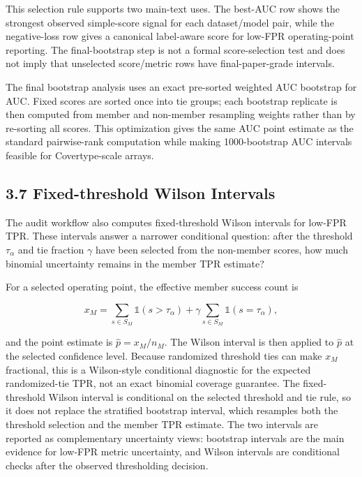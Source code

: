 \documentclass[
  10pt,
  twocolumn]{article}
\begin{document}
This selection rule supports two main-text uses. The best-AUC row shows the strongest observed simple-score signal for each dataset/model pair, while the negative-loss row gives a canonical label-aware score for low-FPR operating-point reporting. The final-bootstrap step is not a formal score-selection test and does not imply that unselected score/metric rows have final-paper-grade intervals.

The final bootstrap analysis uses an exact pre-sorted weighted AUC bootstrap for AUC. Fixed scores are sorted once into tie groups; each bootstrap replicate is then computed from member and non-member resampling weights rather than by re-sorting all scores. This optimization gives the same AUC point estimate as the standard pairwise-rank computation while making 1000-bootstrap AUC intervals feasible for Covertype-scale arrays.

\hypertarget{fixed-threshold-wilson-intervals}{%
\subsection{3.7 Fixed-threshold Wilson Intervals}\label{fixed-threshold-wilson-intervals}}

The audit workflow also computes fixed-threshold Wilson intervals for low-FPR TPR. These intervals answer a narrower conditional question: after the threshold \(\tau_{\alpha}\) and tie fraction \(\gamma\) have been selected from the non-member scores, how much binomial uncertainty remains in the member TPR estimate?

For a selected operating point, the effective member success count is

\[
x_M =
\sum_{s \in S_M} \mathbb{1}(s > \tau_{\alpha})
+ \gamma \sum_{s \in S_M} \mathbb{1}(s = \tau_{\alpha}),
\]

and the point estimate is \(\hat{p}=x_M/n_M\). The Wilson interval is then applied to \(\hat{p}\) at the selected confidence level. Because randomized threshold ties can make \(x_M\) fractional, this is a Wilson-style conditional diagnostic for the expected randomized-tie TPR, not an exact binomial coverage guarantee. The fixed-threshold Wilson interval is conditional on the selected threshold and tie rule, so it does not replace the stratified bootstrap interval, which resamples both the threshold selection and the member TPR estimate. The two intervals are reported as complementary uncertainty views: bootstrap intervals are the main evidence for low-FPR metric uncertainty, and Wilson intervals are conditional checks after the observed thresholding decision.
\end{document}
